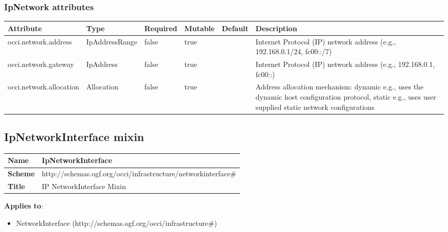 \documentclass{article}
\begin{document}
\subsubsection{IpNetwork attributes}
\begin{tabularx}{\textwidth}{|l|l|p{1.4cm}|p{1.3cm}|l|X|}
  \hline
  \textbf{Attribute} & \textbf{Type} & \textbf{Required} & \textbf{Mutable} & \textbf{Default} & \textbf{Description} \\
  \hline  
  occi.network.address & IpAddressRange & false & true &  & Internet Protocol (IP) network address (e.g., 192.168.0.1/24, fc00::/7) \\
  \hline
  occi.network.gateway & IpAddress & false & true &  & Internet Protocol (IP) network address (e.g., 192.168.0.1, fc00::) \\
  \hline
  occi.network.allocation & Allocation & false & true &  & Address allocation mechanism: dynamic e.g., uses the dynamic host configuration protocol, static e.g., uses user supplied static network configurations \\
  \hline
\end{tabularx}


\subsection{IpNetworkInterface mixin}
\begin{center}
\begin{tabular}{|l|l|}
  \hline
  \textbf{Name} & IpNetworkInterface \\
  \hline  
  \textbf{Scheme} & http://schemas.ogf.org/occi/infrastructure/networkinterface\# \\
  \hline
  \textbf{Title} & IP NetworkInterface Mixin \\
  \hline
\end{tabular}
\end{center}
\textbf{Applies to}:
\begin{itemize}
	\item NetworkInterface (http://schemas.ogf.org/occi/infrastructure\#)
\end{itemize}
\end{document}
